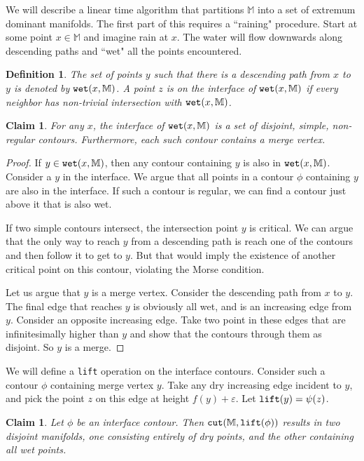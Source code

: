 \documentclass[11pt]{article}
\newtheorem{claim}[theorem]{Claim}
\newtheorem{definition}[theorem]{Definition}
\theoremstyle{definition}
\newcommand{\MM}{\mathbb{M}}
\newcommand{\eps}{\varepsilon}
\newcommand{\cut}{{\tt cut}}
\newcommand{\cont}{\psi}
\newcommand{\lift}{{\tt lift}}
\newcommand{\wet}{{\tt wet}}
\begin{document}
We will describe a linear time algorithm that partitions $\MM$ into a set of extremum dominant manifolds.
The first part of this requires a ``raining" procedure. Start at some point $x \in \MM$ and imagine rain at $x$.
The water will flow downwards along descending paths and ``wet" all the points encountered.

\begin{definition} \label{def:wet} The set of points $y$ such that there is a descending path from $x$ to $y$
is denoted by $\wet(x,\MM)$. A point $z$ is on the \emph{interface} of $\wet(x,\MM)$ if every neighbor
has non-trivial intersection with $\wet(x,\MM)$.
\end{definition}

\begin{claim} \label{clm:inter} For any $x$, the interface of $\wet(x,\MM)$ is a set of disjoint, simple, non-regular contours.
Furthermore, each such contour contains a merge vertex.
\end{claim}

\begin{proof} If $y \in \wet(x,\MM)$, then any contour containing $y$ is also in $\wet(x,\MM)$.
Consider a $y$ in the interface. We argue that all points in a contour $\phi$ containing $y$
are also in the interface. If such a contour is regular, we can find a contour just above it that
is also wet. 

If two simple contours intersect, the intersection point $y$ is critical. We can argue that the only
way to reach $y$ from a descending path is reach one of the contours and then follow it to get to $y$.
But that would imply the existence of another critical point on this contour, violating the Morse condition.

Let us argue that $y$ is a merge vertex. Consider the descending path from $x$ to $y$. The final edge
that reaches $y$ is obviously all wet, and is an increasing edge from $y$. Consider an opposite increasing
edge. Take two point in these edges that are infinitesimally higher than $y$ and show that the contours
through them as disjoint. So $y$ is a merge.
\end{proof}

We will define a \lift{} operation on the interface contours. Consider such a contour $\phi$ containing
merge vertex $y$. Take any dry increasing edge incident to $y$, and pick the point $z$ on this edge at height
$f(y) + \eps$. Let $\lift(y) = \cont(z)$.

\begin{claim} \label{clm:cut-int} Let $\phi$ be an interface contour. Then $\cut(\MM,\lift(\phi))$
results in two disjoint manifolds, one consisting entirely of dry points, and the other containing
all wet points.
\end{claim}
\end{document}
